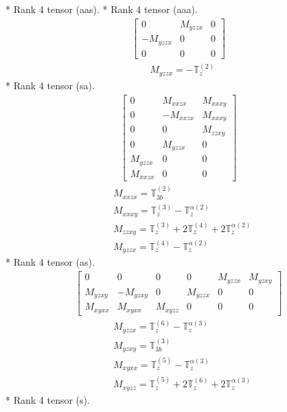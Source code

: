 \documentclass[fleqn,8pt,landscape]{jsarticle}
\begin{document}
* Rank 4 tensor (aas).
* Rank 4 tensor (aaa).
\begin{align*}
\begin{bmatrix} 0 & M_{yzzx} & 0 \\ - M_{yzzx} & 0 & 0 \\ 0 & 0 & 0 \end{bmatrix}
\end{align*}
\begin{align*}
& M_{yzzx} = - \mathbb{T}_{z}^{(2)}
\end{align*}
* Rank 4 tensor (sa).
\begin{align*}
\begin{bmatrix} 0 & M_{xxzx} & M_{xxxy} \\ 0 & - M_{xxzx} & M_{xxxy} \\ 0 & 0 & M_{zzxy} \\ 0 & M_{yzzx} & 0 \\ M_{yzzx} & 0 & 0 \\ M_{xxzx} & 0 & 0 \end{bmatrix}
\end{align*}
\begin{align*}
& M_{xxzx} = \mathbb{T}_{3b}^{(2)} \\
& M_{xxxy} = \mathbb{T}_{z}^{(3)} - \mathbb{T}_{z}^{\alpha(2)} \\
& M_{zzxy} = \mathbb{T}_{z}^{(3)} + 2 \mathbb{T}_{z}^{(4)} + 2 \mathbb{T}_{z}^{\alpha(2)} \\
& M_{yzzx} = \mathbb{T}_{z}^{(4)} - \mathbb{T}_{z}^{\alpha(2)}
\end{align*}
* Rank 4 tensor (as).
\begin{align*}
\begin{bmatrix} 0 & 0 & 0 & 0 & M_{yzzx} & M_{yzxy} \\ M_{yzxy} & - M_{yzxy} & 0 & M_{yzzx} & 0 & 0 \\ M_{xyxx} & M_{xyxx} & M_{xyzz} & 0 & 0 & 0 \end{bmatrix}
\end{align*}
\begin{align*}
& M_{yzzx} = \mathbb{T}_{z}^{(6)} - \mathbb{T}_{z}^{\alpha(3)} \\
& M_{yzxy} = \mathbb{T}_{3b}^{(3)} \\
& M_{xyxx} = \mathbb{T}_{z}^{(5)} - \mathbb{T}_{z}^{\alpha(3)} \\
& M_{xyzz} = \mathbb{T}_{z}^{(5)} + 2 \mathbb{T}_{z}^{(6)} + 2 \mathbb{T}_{z}^{\alpha(3)}
\end{align*}
* Rank 4 tensor (s).
\end{document}
